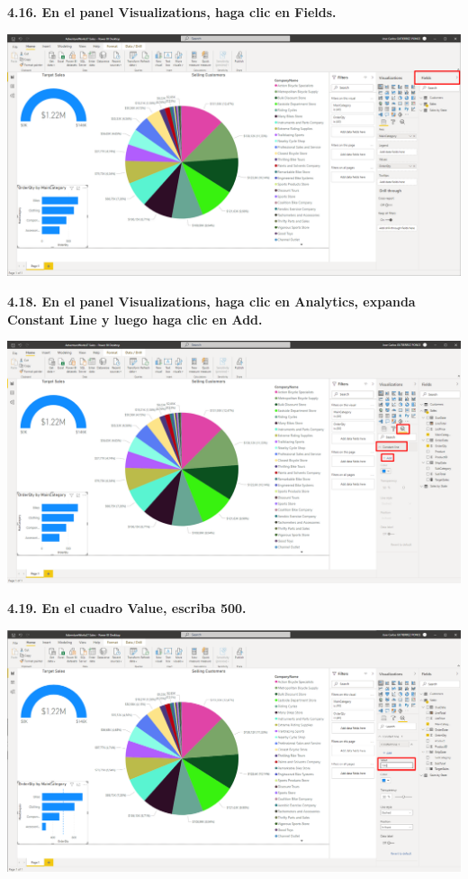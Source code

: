\documentclass{article}
\begin{document}
\newpage
\textbf{4.16. En el panel \textbf{Visualizations}, haga clic en \textbf{Fields}.}

    \begin{center}
		\includegraphics[width=14cm]{./images/92} 
	\end{center}



\textbf{4.18. En el panel \textbf{Visualizations}, haga clic en \textbf{Analytics}, expanda \textbf{Constant Line} y luego haga clic en \textbf{Add}.}

    \begin{center}
		\includegraphics[width=14cm]{./images/94} 
	\end{center}

\newpage
\textbf{4.19. En el cuadro \textbf{Value}, escriba \textbf{500}.}

    \begin{center}
		\includegraphics[width=14cm]{./images/95} 
	\end{center}
\end{document}
